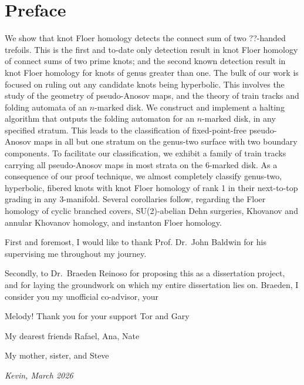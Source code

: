 \chapter*{Preface}
\label{ch:preface}

We show that knot Floer homology detects the connect sum of two ??-handed trefoils. This is the first and to-date only detection result in knot Floer homology of connect sums of two prime knots; and the second known detection result in knot Floer homology for knots of genus greater than one. The bulk of our work is focused on ruling out any candidate knots being hyperbolic. This involves the study of the geometry of pseudo-Anosov maps, and the theory of train tracks and folding automata of an $n$-marked disk. We construct and implement a halting algorithm that outputs the folding automaton for an $n$-marked disk, in any specified stratum. This leads to the classification of fixed-point-free pseudo-Anosov maps in all but one stratum on the genus-two surface with two boundary components. To facilitate our classification, we exhibit a family of train tracks carrying all pseudo-Anosov maps in most strata
on the $6$-marked disk. As a consequence of our proof technique, we almost completely classify genus-two, hyperbolic, fibered knots with knot Floer homology of rank 1 in
their next-to-top grading in any 3-manifold. Several corollaries follow, regarding the
Floer homology of cyclic branched covers, SU(2)-abelian Dehn surgeries, Khovanov
and annular Khovanov homology, and instanton Floer homology.


First and foremost, I would like to thank Prof. Dr.~John Baldwin for his  supervising me throughout my journey.

Secondly, to Dr.~Braeden Reinoso for proposing this as a dissertation project, and for laying the groundwork on which my entire dissertation lies on. Braeden, I consider you my unofficial co-advisor, your 


Melody! Thank you for your support Tor and Gary

My dearest friends Rafael, Ana, Nate


My mother, sister, and Steve


\hfill \emph{Kevin, March 2026}
